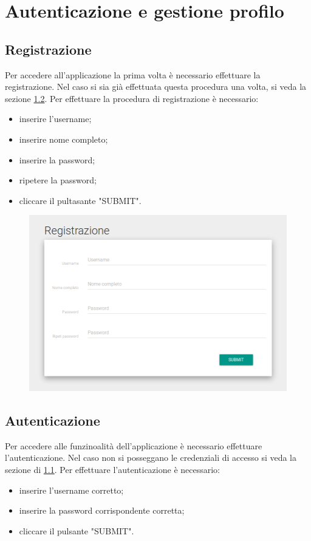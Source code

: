 \documentclass[12pt,a4paper]{article}
\begin{document}
	\newpage
	\section{Autenticazione e gestione profilo}
	\subsection{Registrazione}\label{registrazione}
	Per accedere all'applicazione la prima volta è necessario effettuare la registrazione. Nel caso si sia già effettuata questa procedura una volta, si veda la sezione \ref{autenticazione}.
	Per effettuare la procedura di registrazione è necessario:
	\begin{itemize}
		\item inserire l'username;
		\item inserire nome completo;
		\item inserire la password;
		\item ripetere la password;
		\item cliccare il pultasante "SUBMIT". 
	\end{itemize}

\begin{figure}[h]
		
\centering
\includegraphics[width=0.8\linewidth]{../img/screenshot/signup.png}
\caption{}
\label{Schermata di registrazione}
\end{figure}


	\subsection{Autenticazione}\label{autenticazione}
	Per accedere alle funzinoalità dell'applicazione è necessario effettuare l'autenticazione. Nel caso non si posseggano le credenziali di accesso si veda la sezione di \ref{registrazione}.
	Per effettuare l'autenticazione è necessario:
		\begin{itemize}
			\item inserire l'username corretto;
			\item inserire la password corrispondente corretta;
			\item cliccare il pulsante "SUBMIT".
		\end{itemize}
	
\end{document}
